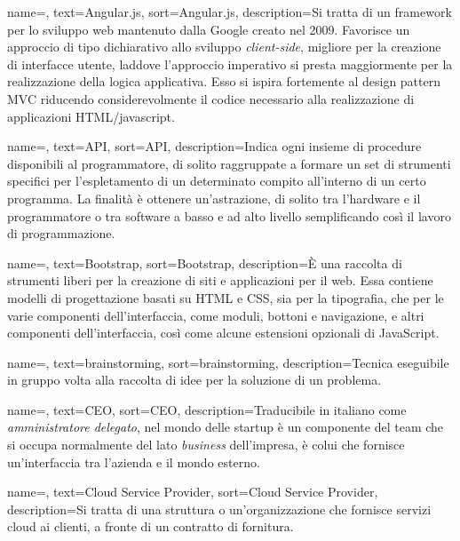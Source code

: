 {
    name=,
    text=Angular.js,
    sort=Angular.js,
    description={Si tratta di un framework per lo sviluppo web mantenuto dalla Google creato nel 2009. Favorisce un approccio di tipo dichiarativo allo sviluppo \textit{client-side}, migliore per la creazione di interfacce utente, laddove l'approccio imperativo si presta maggiormente per la realizzazione della logica applicativa. Esso si ispira fortemente al design pattern MVC riducendo considerevolmente il codice necessario alla realizzazione di applicazioni HTML/javascript.}
}

{
    name=,
    text=API,
    sort=API,
    description={Indica ogni insieme di procedure disponibili al programmatore, di solito raggruppate a formare un set di strumenti specifici per l’espletamento di un determinato compito all’interno di un certo programma. La finalità è ottenere un’astrazione, di solito tra l’hardware e il programmatore o tra software a basso e ad alto livello semplificando così il lavoro di programmazione.}
}

{
    name=,
    text=Bootstrap,
    sort=Bootstrap,
    description={È una raccolta di strumenti liberi per la creazione di siti e applicazioni per il web. Essa contiene modelli di progettazione basati su HTML e CSS, sia per la tipografia, che per le varie componenti dell'interfaccia, come moduli, bottoni e navigazione, e altri componenti dell'interfaccia, così come alcune estensioni opzionali di JavaScript.}
}

{
    name=,
    text=brainstorming,
    sort=brainstorming,
    description={Tecnica eseguibile in gruppo volta alla raccolta di idee per la soluzione di un problema.}
}

{
    name=,
    text=CEO,
    sort=CEO,
    description={Traducibile in italiano come \textit{amministratore delegato}, nel mondo delle startup è un componente del team che si occupa normalmente del lato \textit{business} dell'impresa, è colui che fornisce un'interfaccia tra l'azienda e il mondo esterno.}
}

{
    name=,
    text=Cloud Service Provider,
    sort=Cloud Service Provider,
    description={Si tratta di una struttura o un'organizzazione che fornisce servizi cloud ai clienti, a fronte di un contratto di fornitura.}
}

